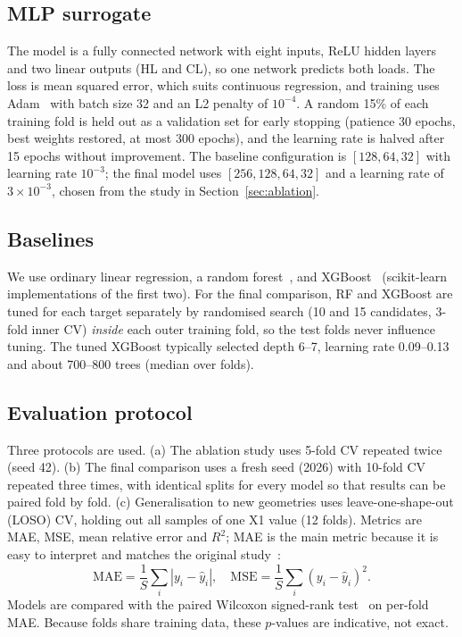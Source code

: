 \documentclass[conference]{IEEEtran}
\begin{document}
\subsection{MLP surrogate}
The model is a fully connected network with eight inputs, ReLU hidden layers and two linear outputs (HL and CL), so one network predicts both loads. The loss is mean squared error, which suits continuous regression, and training uses Adam~\cite{kingma} with batch size 32 and an L2 penalty of $10^{-4}$. A random 15\% of each training fold is held out as a validation set for early stopping (patience 30 epochs, best weights restored, at most 300 epochs), and the learning rate is halved after 15 epochs without improvement. The baseline configuration is $[128,64,32]$ with learning rate $10^{-3}$; the final model uses $[256,128,64,32]$ and a learning rate of $3\times10^{-3}$, chosen from the study in Section~\ref{sec:ablation}.

\subsection{Baselines}
We use ordinary linear regression, a random forest~\cite{breiman}, and XGBoost~\cite{chen} (scikit-learn~\cite{sklearn} implementations of the first two). For the final comparison, RF and XGBoost are tuned for each target separately by randomised search (10 and 15 candidates, 3-fold inner CV) \emph{inside} each outer training fold, so the test folds never influence tuning. The tuned XGBoost typically selected depth 6--7, learning rate 0.09--0.13 and about 700--800 trees (median over folds).

\subsection{Evaluation protocol}
Three protocols are used. (a) The ablation study uses 5-fold CV repeated twice (seed 42). (b) The final comparison uses a fresh seed (2026) with 10-fold CV repeated three times, with identical splits for every model so that results can be paired fold by fold. (c) Generalisation to new geometries uses leave-one-shape-out (LOSO) CV, holding out all samples of one X1 value (12 folds). Metrics are MAE, MSE, mean relative error and $R^2$; MAE is the main metric because it is easy to interpret and matches the original study~\cite{tsanas}:
\begin{equation}
\mathrm{MAE}=\frac{1}{S}\sum_{i}|y_i-\hat y_i|,\quad
\mathrm{MSE}=\frac{1}{S}\sum_{i}(y_i-\hat y_i)^2 .
\end{equation}
Models are compared with the paired Wilcoxon signed-rank test~\cite{wilcoxon} on per-fold MAE. Because folds share training data, these $p$-values are indicative, not exact.
\end{document}
